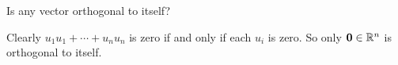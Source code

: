 
\begin{Exercise}[
name={},
title={}, 
difficulty=0,
origin={\cite{JH}}]
Is any vector orthogonal to itself?
\end{Exercise}

\begin{Answer}
Clearly \( u_1u_1+\cdots+u_nu_n \) is zero if and only if
      each \( u_i \) is zero.
      So only \( \bm{0}\in\mathbb{R}^n \) is orthogonal to itself.  
\end{Answer}
